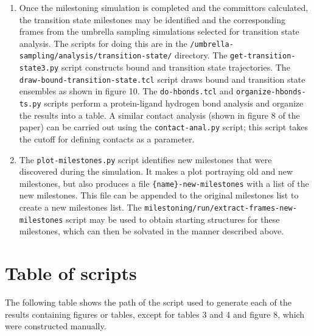 \documentclass{article}      %
\begin{document}
\begin{enumerate}
\item Once the milestoning simulation is completed and the committors calculated, the transition state milestones may be identified and the corresponding frames from the umbrella sampling simulations selected for transition state analysis.   The scripts for doing this are in the \verb+/umbrella-sampling/analysis/transition-state/+ directory.  The \verb+get-transition-state3.py+ script constructs bound and transition state trajectories.  The \verb+draw-bound-transition-state.tcl+ script draws bound and transition state ensembles as shown in figure 10.  The \verb+do-hbonds.tcl+ and \verb+organize-hbonds-ts.py+ scripts perform a protein-ligand hydrogen bond analysis and organize the results into a table.   A similar contact analysis (shown in figure 8 of the paper) can be carried out using the \verb+contact-anal.py+ script; this script takes the cutoff for defining contacts as a parameter. 

\item The \verb+plot-milestones.py+ script identifies new milestones that were discovered during the simulation.  It makes a plot portraying old and new milestones, but also produces a file \verb+{name}-new-milestones+ with a list of the new milestones.  This file can be appended to the original milestones list to create a new milestones list.  The \verb+milestoning/run/extract-frames-new-milestones+ script may be used to obtain starting structures for these milestones, which can then be solvated in the manner described above.  



\end{enumerate}

\section{Table of scripts}

The following table shows the path of the script used to generate each of the results containing figures or tables, except for tables 3 and 4 and figure 8, which were constructed manually.\\
\end{document}
